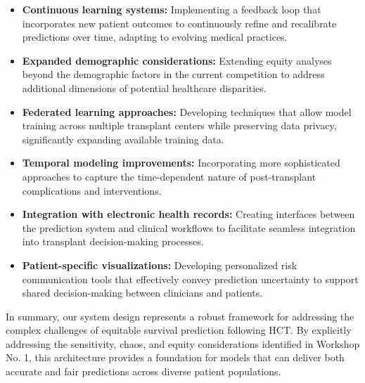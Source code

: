 \begin{itemize}
    \item \textbf{Continuous learning systems:} Implementing a feedback loop that incorporates new patient outcomes to continuously refine and recalibrate predictions over time, adapting to evolving medical practices.
    
    \item \textbf{Expanded demographic considerations:} Extending equity analyses beyond the demographic factors in the current competition to address additional dimensions of potential healthcare disparities.
    
    \item \textbf{Federated learning approaches:} Developing techniques that allow model training across multiple transplant centers while preserving data privacy, significantly expanding available training data.
    
    \item \textbf{Temporal modeling improvements:} Incorporating more sophisticated approaches to capture the time-dependent nature of post-transplant complications and interventions.
    
    \item \textbf{Integration with electronic health records:} Creating interfaces between the prediction system and clinical workflows to facilitate seamless integration into transplant decision-making processes.
    
    \item \textbf{Patient-specific visualizations:} Developing personalized risk communication tools that effectively convey prediction uncertainty to support shared decision-making between clinicians and patients.
\end{itemize}

In summary, our system design represents a robust framework for addressing the complex challenges of equitable survival prediction following HCT. By explicitly addressing the sensitivity, chaos, and equity considerations identified in Workshop No. 1, this architecture provides a foundation for models that can deliver both accurate and fair predictions across diverse patient populations.